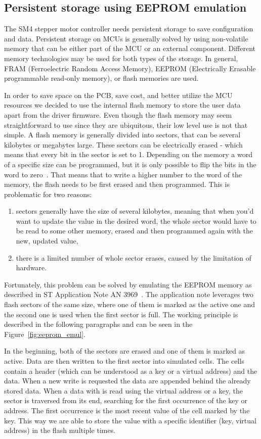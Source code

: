 
\subsection{Persistent storage using EEPROM emulation}
\label{subsec:eeprom}
The SM4 stepper motor controller needs persistent storage to save configuration and data.
Persistent storage on MCUs is generally solved by using non-volatile memory that can be either part of the MCU or an external component.
Different memory technologies may be used for both types of the storage.
In general, FRAM (Ferroelectric Random Access Memory), EEPROM (Electrically Erasable programmable read-only memory), or flash memories are used.

In order to save space on the PCB, save cost, and better utilize the MCU resources we decided to use the internal flash memory to store the user data apart from the driver firmware.
Even though the flash memory may seem straightforward to use since they are ubiquitous, their low level use is not that simple.
A flash memory is generally divided into sectors, that can be several kilobytes or megabytes large.
These sectors can be electrically erased - which means that every bit in the sector is set to 1.
Depending on the memory a word of a specific size can be programmed, but it is only possible to flip the bits in the word to zero~\cite{ecorax_flash}.
That means that to write a higher number to the word of the memory, the flash needs to be first erased and then programmed.
This is problematic for two reasons:
\begin{enumerate}
    \item sectors generally have the size of several kilobytes, meaning that when you'd want to update the value in the desired word, the whole sector would have to be read to some other memory, erased and then programmed again with the new, updated value,
    \item there is a limited number of whole sector erases, caused by the limitation of hardware.
\end{enumerate}

Fortunately, this problem can be solved by emulating the EEPROM memory as described in ST Application Note AN 3969~\cite{eeprom_appnote}.
The application note leverages two flash sectors of the same size, where one of them is marked as the active one and the second one is used when the first sector is full.
The working principle is described in the following paragraphs and can be seen in the Figure~\ref{fig:eeprom_emul}.

In the beginning, both of the sectors are erased and one of them is marked as active.
Data are then written to the first sector into simulated cells.
The cells contain a header (which can be understood as a key or a virtual address) and the data.
When a new write is requested the data are appended behind the already stored data.
When a data with is read using the virtual address or a key, the sector is traversed from its end, searching for the first occurrence of the key or address.
The first occurrence is the most recent value of the cell marked by the key.
This way we are able to store the value with a specific identifier (key, virtual address) in the flash multiple times.

